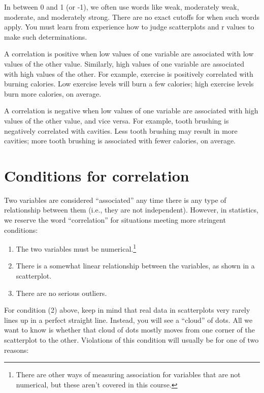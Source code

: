 \documentclass[
]{book}
\providecommand{\tightlist}{%
  \setlength{\itemsep}{0pt}\setlength{\parskip}{0pt}}
\begin{document}
In between 0 and 1 (or -1), we often use words like weak, moderately weak, moderate, and moderately strong. There are no exact cutoffs for when such words apply. You must learn from experience how to judge scatterplots and r values to make such determinations.

A correlation is positive when low values of one variable are associated with low values of the other value. Similarly, high values of one variable are associated with high values of the other. For example, exercise is positively correlated with burning calories. Low exercise levels will burn a few calories; high exercise levels burn more calories, on average.

A correlation is negative when low values of one variable are associated with high values of the other value, and vice versa. For example, tooth brushing is negatively correlated with cavities. Less tooth brushing may result in more cavities; more tooth brushing is associated with fewer calories, on average.

\hypertarget{correlation-conditions}{%
\section{Conditions for correlation}\label{correlation-conditions}}

Two variables are considered ``associated'' any time there is any type of relationship between them (i.e., they are not independent). However, in statistics, we reserve the word ``correlation'' for situations meeting more stringent conditions:

\begin{enumerate}
\def\labelenumi{\arabic{enumi}.}
\tightlist
\item
  The two variables must be numerical.\footnote{There are other ways of measuring association for variables that are not numerical, but these aren't covered in this course.}
\item
  There is a somewhat linear relationship between the variables, as shown in a scatterplot.
\item
  There are no serious outliers.
\end{enumerate}

For condition (2) above, keep in mind that real data in scatterplots very rarely lines up in a perfect straight line. Instead, you will see a ``cloud'' of dots. All we want to know is whether that cloud of dots mostly moves from one corner of the scatterplot to the other. Violations of this condition will usually be for one of two reasons:
\end{document}
